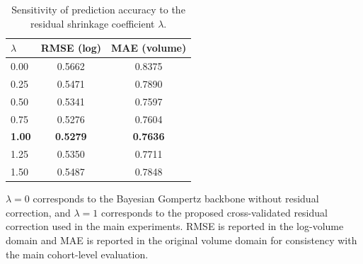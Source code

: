 \begin{table}[!htbp]
\centering
\caption{Sensitivity of prediction accuracy to the residual shrinkage coefficient $\lambda$.}
\label{tab:lambda_sensitivity}
\begin{tabular}{lcc}
\toprule
$\lambda$ & RMSE (log) & MAE (volume) \\
\midrule
0.00 & 0.5662 & 0.8375 \\
0.25 & 0.5471 & 0.7890 \\
0.50 & 0.5341 & 0.7597 \\
0.75 & 0.5276 & 0.7604 \\
\textbf{1.00} & \textbf{0.5279} & \textbf{0.7636} \\
1.25 & 0.5350 & 0.7711 \\
1.50 & 0.5487 & 0.7848 \\
\bottomrule
\end{tabular}

\vspace{1mm}
\footnotesize{$\lambda=0$ corresponds to the Bayesian Gompertz backbone without residual correction, and $\lambda=1$ corresponds to the proposed cross-validated residual correction used in the main experiments. RMSE is reported in the log-volume domain and MAE is reported in the original volume domain for consistency with the main cohort-level evaluation.}
\end{table}
